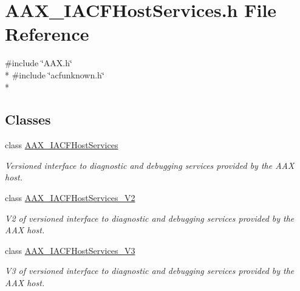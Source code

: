 \hypertarget{a00228}{}\section{A\+A\+X\+\_\+\+I\+A\+C\+F\+Host\+Services.\+h File Reference}
\label{a00228}
{\ttfamily \#include \char`\"{}A\+A\+X.\+h\char`\"{}}\\*
{\ttfamily \#include \char`\"{}acfunknown.\+h\char`\"{}}\\*
\subsection*{Classes}
\begin{DoxyCompactItemize}
\item 
class \hyperlink{a00071}{A\+A\+X\+\_\+\+I\+A\+C\+F\+Host\+Services}
\begin{DoxyCompactList}\small\item\em Versioned interface to diagnostic and debugging services provided by the A\+A\+X host. \end{DoxyCompactList}\item 
class \hyperlink{a00072}{A\+A\+X\+\_\+\+I\+A\+C\+F\+Host\+Services\+\_\+\+V2}
\begin{DoxyCompactList}\small\item\em V2 of versioned interface to diagnostic and debugging services provided by the A\+A\+X host. \end{DoxyCompactList}\item 
class \hyperlink{a00073}{A\+A\+X\+\_\+\+I\+A\+C\+F\+Host\+Services\+\_\+\+V3}
\begin{DoxyCompactList}\small\item\em V3 of versioned interface to diagnostic and debugging services provided by the A\+A\+X host. \end{DoxyCompactList}\end{DoxyCompactItemize}
